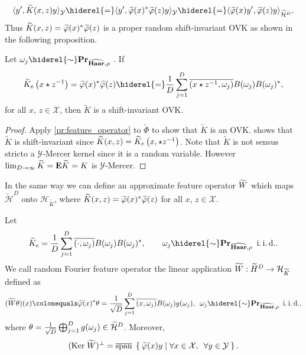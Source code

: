 \begin{dmath*}
\inner{y', \widetilde{K}(x, z)y}_{\mathcal{Y}} \hiderel{=} \inner{y', \tildePhi{1:D}(x)^\adjoint \tildePhi{1:D}(z)y}_{\mathcal{Y}} \hiderel{=} \inner{\tildePhi{1:D}(x)y', \tildePhi{1:D}(z)y}_{\widetilde{\mathcal{H}}^D}.
\end{dmath*}
Thus $\widetilde{K}(x,z)=\tildePhi{1:D}(x)^\adjoint \tildePhi{1:D}(z)$ is a proper random shift-invariant \acl{OVK} as shown in the following proposition.
\begin{proposition} Let $\omega_j \hiderel{\sim} \probability_{\dual{\Haar},\rho}$ \iid. If
\begin{dmath*}
\widetilde{K}_e\left(x\groupop z^{-1}\right)=\tildePhi{1:D}(x)^{\adjoint}\tildePhi{1:D}(z)\hiderel{=}\frac{1}{D}\sum_{j=1}^D \conj{\pairing{x\groupop z^{-1},\omega_j}}B(\omega_j)B(\omega_j)^*,
\end{dmath*}
for all $x$,  $z\in\mathcal{X}$, then $\widetilde{K}$ is a shift-invariant \acl{OVK}.
\end{proposition}
\begin{proof} Apply \cref{pr:feature_operator} to $\widetilde{\Phi}$ to show that $\widetilde{K}$ is an \acs{OVK}.  shows that $\widetilde{K}$ is shift-invariant since $\widetilde{K}(x,z)=\widetilde{K}_e\left(x,\groupop z^{-1}\right)$. Note that $\widetilde{K}$ is not sensus stricto a $\mathcal{Y}$-Mercer kernel since it is a random variable. However $\lim_{D\to\infty} \widetilde{K} = \expectation \widetilde{K} = K$ is $\mathcal{Y}$-Mercer.
\end{proof}
In the same way we can define an approximate feature operator $\tildeW{D}$ which maps $\widetilde{\mathcal{H}}^D$ onto $\mathcal{H}_{\widetilde{K}}$, where $\widetilde{K}(x,z)=\tildePhi{1:D}(x)^\adjoint\tildePhi{1:D}(z)$ for all $x$, $z\in\mathcal{X}$.
\begin{definition} Let
\begin{dmath*}
\widetilde{K}_e=\frac{1}{D}\sum_{j=1}^D \conj{\pairing{\cdot,\omega_j}}B(\omega_j)B(\omega_j)^*, \qquad \omega_j \hiderel{\sim} \probability_{\dual{\Haar},\rho} \enskip\text{\iid}.
\end{dmath*}
We call random Fourier feature operator the linear application $\tildeW{D}:\widetilde{H}^D\to \mathcal{H}_{\widetilde{K}}$ defined as
\begin{dmath*}
(\tildeW{D} \theta)(x) \colonequals \tildePhi{1:D}(x)^\adjoint \theta =\frac{1}{\sqrt{D}}\sum_{j=1}^D \conj{\pairing{x,\omega_j}}B(\omega_j)g(\omega_j), \enskip \omega_j \hiderel{\sim} \probability_{\dual{\Haar},\rho} \enskip\text{\iid}.
\end{dmath*}
where $\theta=\frac{1}{\sqrt{D}}\Vect_{j=1}^Dg(\omega_j)\in\widetilde{\mathcal{H}}^D$. Moreover,
\begin{dmath*}
(\Ker \widetilde{W})^\perp = \lspan\Set{\tildePhi{1:D}(x)y | \forall x\in\mathcal{X},\enskip \forall y\in\mathcal{Y}}.
\end{dmath*}
\end{definition}
